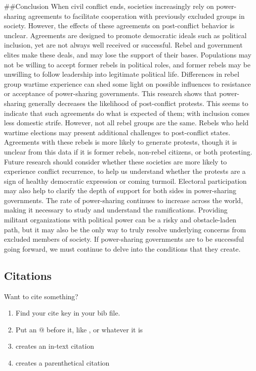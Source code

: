 \documentclass[11pt,]{article}
\providecommand{\tightlist}{%
\setlength{\itemsep}{0pt}\setlength{\parskip}{0pt}}
\begin{document}
\#\#Conclusion When civil conflict ends, societies increasingly rely on
power-sharing agreements to facilitate cooperation with previously
excluded groups in society. However, the effects of these agreements on
post-conflict behavior is unclear. Agreements are designed to promote
democratic ideals such as political inclusion, yet are not always well
received or successful. Rebel and government elites make these deals,
and may lose the support of their bases. Populations may not be willing
to accept former rebels in political roles, and former rebels may be
unwilling to follow leadership into legitimate political life.
Differences in rebel group wartime experience can shed some light on
possible influences to resistance or acceptance of power-sharing
governments. This research shows that power-sharing generally decreases
the likelihood of post-conflict protests. This seems to indicate that
such agreements do what is expected of them; with inclusion comes less
domestic strife. However, not all rebel groups are the same. Rebels who
held wartime elections may present additional challenges to
post-conflict states. Agreements with these rebels is more likely to
generate protests, though it is unclear from this data if it is former
rebels, non-rebel citizens, or both protesting. Future research should
consider whether these societies are more likely to experience conflict
recurrence, to help us understand whether the protests are a sign of
healthy democratic expression or coming turmoil. Electoral participation
may also help to clarify the depth of support for both sides in
power-sharing governments. The rate of power-sharing continues to
increase across the world, making it necessary to study and understand
the ramifications. Providing militant organizations with political power
can be a risky and obstacle-laden path, but it may also be the only way
to truly resolve underlying concerns from excluded members of society.
If power-sharing governments are to be successful going forward, we must
continue to delve into the conditions that they create.

\hypertarget{citations}{%
\subsection{Citations}\label{citations}}

Want to cite something?

\begin{enumerate}
\def\labelenumi{\arabic{enumi}.}
\tightlist
\item
  Find your cite key in your bib file.
\item
  Put an @ before it, like \citet{Solt2017}, or whatever it is
\item
  \citet{Solt2017} creates an in-text citation
\item
  \citep{Herndon2014} creates a parenthetical citation
\end{enumerate}
\end{document}
